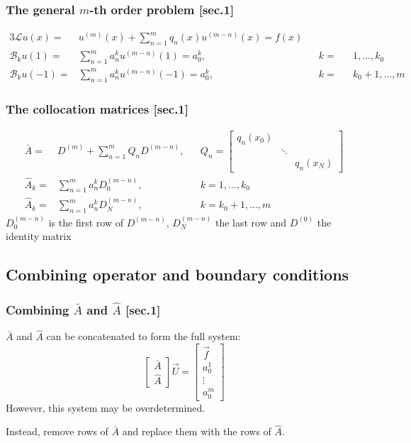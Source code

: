 \documentclass{beamer}
\begin{document}
\begin{frame}
\frametitle{The general $m$-th order problem [sec.1]}
\begin{alignat*}{3}
\mathcal{L} u(x) = &  u^{(m)}(x) + \sum_{n = 1}^m q_n(x) u^{(m-n)}(x) = f(x) \\
\mathcal{B}_k u(1) = & \sum_{n = 1}^m a_n^k u^{(m-n)}(1) = a_0^k, && k = && 1,...,k_0 \\
\mathcal{B}_k u(-1) = & \sum_{n = 1}^m a_n^k u^{(m-n)}(-1) = a_0^k, && k = && k_0+1,...,m 
\end{alignat*}
\end{frame}

\begin{frame}
\frametitle{The collocation matrices [sec.1]}
\begin{align*}
\bar{A} = & D^{(m)} + \sum_{n=1}^m Q_n D^{(m-n)}, && Q_n = \begin{bmatrix} q_n(x_0) & & \\ & \ddots & \\ & & q_n(x_N) \end{bmatrix} \\
\hat{A}_k = & \sum_{n=1}^m a_n^k D^{(m-n)}_0, && k = 1,...,k_0 \\
\hat{A}_k = & \sum_{n=1}^m a_n^k D^{(m-n)}_N, && k = k_0+1,...,m
\end{align*}
$D_0^{(m-n)}$ is the first row of $D^{(m-n)}$, $D_N^{(m-n)}$ the last row and $D^{(0)}$ the identity matrix
\end{frame}

\subsection{Combining operator and boundary conditions}

\begin{frame}
\frametitle{Combining $\bar{A}$ and $\hat{A}$ [sec.1]}
$\bar{A}$ and $\hat{A}$ can be concatenated to form the full system:
\begin{equation*}
\begin{bmatrix} \bar{A} \\ \hat{A} \end{bmatrix} \vec{U} = \begin{bmatrix} \vec{f} \\ a_0^1 \\ \vdots \\ a_0^m \end{bmatrix}
\end{equation*}
However, this system may be overdetermined.

Instead, remove rows of $\bar{A}$ and replace them with the rows of $\hat{A}$.
\end{frame}
\end{document}
